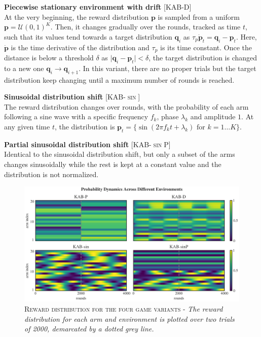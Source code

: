 \hfill \break
\noindent \textbf{Piecewise stationary environment with drift} [\textsc{KAB-D}]\\ At the very beginning, the reward distribution $\mathbf{p}$ is sampled from a uniform $\mathbf{p}=\mathcal{U}(0, 1)^{K}$. Then, it changes gradually over the rounds, tracked as time $t$, such that its values tend towards a target distribution $\mathbf{q}_{i}$ as $\tau_{p}\dot{\mathbf{p}}_{t}=\mathbf{q}_{i}-\mathbf{p}_{t}$.
Here, $\dot{\mathbf{p}}$ is the time derivative of the distribution and $\tau_{p}$ is its time constant.
Once the distance is below a threshold $\delta$ as $\vert \mathbf{q}_{i} - \mathbf{p}_{t}\vert < \delta$, the target distribution is changed to a new one $\mathbf{q}_{i}\to\mathbf{q}_{i+1}$. In this variant, there are no proper trials but the target distribution keep changing until a maximum number
of rounds is reached.

\hfill \break
\noindent \textbf{Sinusoidal distribution shift} [\textsc{KAB-$\sin$}]\\ The reward distribution changes over rounds, with the probability of each arm following a sine wave with a specific frequency $f_{k}$, phase $\lambda_{k}$ and amplitude $1$. At any given time $t$, the distribution is $\mathbf{p}_{t}=\{\sin(2\pi f_{k} t+\lambda_{k})\text{  for }k=1\ldots K\}$.

\hfill \break
\noindent \textbf{Partial sinusoidal distribution shift} [\textsc{KAB-$\sin$P}]\\ Identical to the sinusoidal distribution shift, but only a subset of the arms changes sinusoidally while the rest is kept at a constant value and the distribution is not normalized.


\begin{figure}[h]
    \centering
    \includegraphics[width=1.\textwidth]{figures/envs_1.png}
    \caption{\textsc{Reward distribution for the four game variants} - \textit{The reward distribution for each arm and environment is plotted over two trials of 2000, demarcated by a dotted grey line.}}
    \label{fig:envs}
\end{figure}

